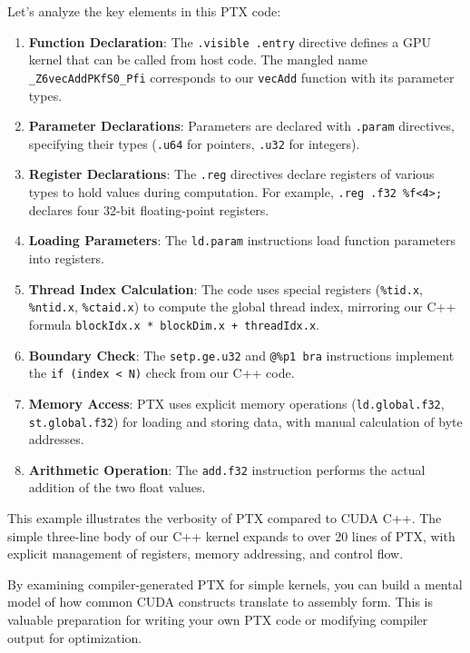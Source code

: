 Let's analyze the key elements in this PTX code:

\begin{enumerate}
    \item \textbf{Function Declaration}: The \texttt{.visible .entry} directive defines a GPU kernel that can be called from host code. The mangled name \texttt{\_Z6vecAddPKfS0\_Pfi} corresponds to our \texttt{vecAdd} function with its parameter types.
    
    \item \textbf{Parameter Declarations}: Parameters are declared with \texttt{.param} directives, specifying their types (\texttt{.u64} for pointers, \texttt{.u32} for integers).
    
    \item \textbf{Register Declarations}: The \texttt{.reg} directives declare registers of various types to hold values during computation. For example, \texttt{.reg .f32 \%f<4>;} declares four 32-bit floating-point registers.
    
    \item \textbf{Loading Parameters}: The \texttt{ld.param} instructions load function parameters into registers.
    
    \item \textbf{Thread Index Calculation}: The code uses special registers (\texttt{\%tid.x}, \texttt{\%ntid.x}, \texttt{\%ctaid.x}) to compute the global thread index, mirroring our C++ formula \texttt{blockIdx.x * blockDim.x + threadIdx.x}.
    
    \item \textbf{Boundary Check}: The \texttt{setp.ge.u32} and \texttt{@\%p1 bra} instructions implement the \texttt{if (index < N)} check from our C++ code.
    
    \item \textbf{Memory Access}: PTX uses explicit memory operations (\texttt{ld.global.f32}, \texttt{st.global.f32}) for loading and storing data, with manual calculation of byte addresses.
    
    \item \textbf{Arithmetic Operation}: The \texttt{add.f32} instruction performs the actual addition of the two float values.
\end{enumerate}

This example illustrates the verbosity of PTX compared to CUDA C++. The simple three-line body of our C++ kernel expands to over 20 lines of PTX, with explicit management of registers, memory addressing, and control flow.


By examining compiler-generated PTX for simple kernels, you can build a mental model of how common CUDA constructs translate to assembly form. This is valuable preparation for writing your own PTX code or modifying compiler output for optimization.

